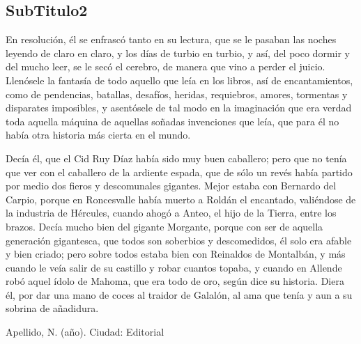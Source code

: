 \subsection{SubTitulo2}
 En resolución, él se enfrascó tanto en su lectura, que se le pasaban las noches leyendo de claro en claro, y los días de turbio en turbio, y así, del poco dormir y del mucho leer, se le secó el cerebro, de manera que vino a perder el juicio. Llenósele la fantasía de todo aquello que leía en los libros, así de encantamientos, como de pendencias, batallas, desafíos, heridas, requiebros, amores, tormentas y disparates imposibles, y asentósele de tal modo en la imaginación que era verdad toda aquella máquina de aquellas soñadas invenciones que leía, que para él no había otra historia más cierta en el mundo.

Decía él, que el Cid Ruy Díaz había sido muy buen caballero; pero que no tenía que ver con el caballero de la ardiente espada, que de sólo un revés había partido por medio dos fieros y descomunales gigantes. Mejor estaba con Bernardo del Carpio, porque en Roncesvalle había muerto a Roldán el encantado, valiéndose de la industria de Hércules, cuando ahogó a Anteo, el hijo de la Tierra, entre los brazos. Decía mucho bien del gigante Morgante, porque con ser de aquella generación gigantesca, que todos son soberbios y descomedidos, él solo era afable y bien criado; pero sobre todos estaba bien con Reinaldos de Montalbán, y más cuando le veía salir de su castillo y robar cuantos topaba, y cuando en Allende robó aquel ídolo de Mahoma, que era todo de oro, según dice su historia. Diera él, por dar una mano de coces al traidor de Galalón, al ama que tenía y aun a su sobrina de añadidura.


\begin{thebibliography}{9}
 Apellido, N. (año).
\newblock Ciudad:
\newblock Editorial
\end{thebibliography}

%
